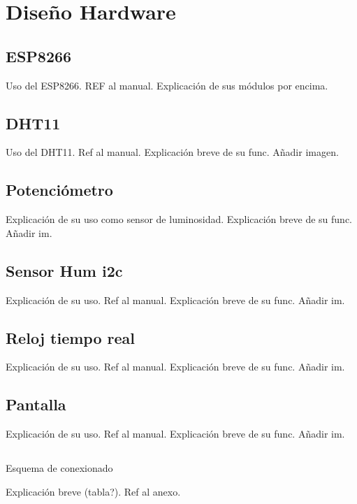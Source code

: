 \section{Diseño Hardware}\label{sec:dishard}

\subsection{ESP8266}

Uso del ESP8266. REF al manual. Explicación de sus módulos por encima.

\subsection{DHT11}

Uso del DHT11. Ref al manual. Explicación breve de su func. Añadir imagen.

\subsection{Potenciómetro}

Explicación de su uso como sensor de luminosidad. Explicación breve de su func. Añadir im.

\subsection{Sensor Hum i2c}

Explicación de su uso. Ref al manual. Explicación breve de su func. Añadir im.

\subsection{Reloj tiempo real}

Explicación de su uso. Ref al manual. Explicación breve de su func. Añadir im.

\subsection{Pantalla}

Explicación de su uso. Ref al manual. Explicación breve de su func. Añadir im.

\subsection{}{Esquema de conexionado}

Explicación breve (tabla?). Ref al anexo.

